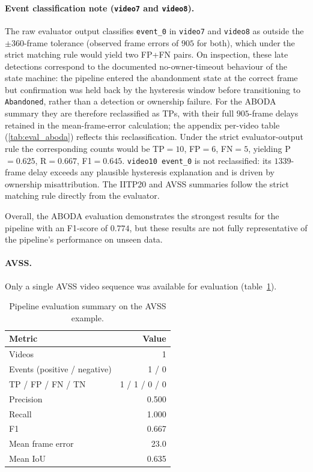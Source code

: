 \paragraph{Event classification note (\texttt{video7} and \texttt{video8}).}
The raw evaluator output classifies \texttt{event\_0} in \texttt{video7} and
\texttt{video8} as outside the $\pm 360$-frame tolerance (observed frame
errors of $905$ for both), which under the strict matching rule would yield
two FP+FN pairs. On inspection, these late detections correspond to the
documented no-owner-timeout behaviour of the state machine: the pipeline
entered the abandonment state at the correct frame but confirmation was held
back by the hysteresis window before transitioning to \texttt{Abandoned},
rather than a detection or ownership failure. For the ABODA summary they are
therefore reclassified as TPs, with their full $905$-frame delays retained
in the mean-frame-error calculation; the appendix per-video table
(\ref{tab:eval_aboda}) reflects this reclassification. Under the strict
evaluator-output rule the corresponding counts would be TP$=10$, FP$=6$,
FN$=5$, yielding P$=0.625$, R$=0.667$, F1$=0.645$. \texttt{video10 event\_0}
is not reclassified: its $1339$-frame delay exceeds any plausible hysteresis
explanation and is driven by ownership misattribution. The IITP20 and AVSS
summaries follow the strict matching rule directly from the evaluator.

Overall, the ABODA evaluation demonstrates the strongest results for the
pipeline with an F1-score of $0.774$, but these results are not fully
representative of the pipeline's performance on unseen data.

\paragraph{AVSS.}

Only a single AVSS video sequence was available for evaluation
(table~\ref{tab:eval_avss_summary}).

\begin{table}
	\centering
	\small
	\begin{tabularx}{\linewidth}{@{}>{\raggedright\arraybackslash}X r@{}}
		\toprule
		\textbf{Metric}              & \textbf{Value} \\
		\midrule
		Videos                       & 1              \\
		Events (positive / negative) & 1 / 0          \\
		TP / FP / FN / TN            & 1 / 1 / 0 / 0  \\
		Precision                    & 0.500          \\
		Recall                       & 1.000          \\
		F1                           & 0.667          \\
		Mean frame error             & 23.0           \\
		Mean IoU                     & 0.635          \\
		\bottomrule
	\end{tabularx}
	\caption{Pipeline evaluation summary on the AVSS example.}
	\label{tab:eval_avss_summary}
\end{table}

